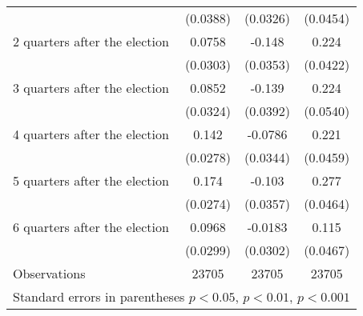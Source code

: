 \begin{table}[!ht]
\begin{tabular}{l*{3}{c}}
                    &    (0.0388)         &    (0.0326)         &    (0.0454)         \\
[0,5em]
 2 quarters after the election&      0.0758\sym{*}  &      -0.148\sym{***}&       0.224\sym{***}\\
                    &    (0.0303)         &    (0.0353)         &    (0.0422)         \\
[0,5em]
 3 quarters after the election&      0.0852\sym{**} &      -0.139\sym{***}&       0.224\sym{***}\\
                    &    (0.0324)         &    (0.0392)         &    (0.0540)         \\
[0,5em]
 4 quarters after the election&       0.142\sym{***}&     -0.0786\sym{*}  &       0.221\sym{***}\\
                    &    (0.0278)         &    (0.0344)         &    (0.0459)         \\
[0,5em]
 5 quarters after the election&       0.174\sym{***}&      -0.103\sym{**} &       0.277\sym{***}\\
                    &    (0.0274)         &    (0.0357)         &    (0.0464)         \\
[0,5em]
 6 quarters after the election&      0.0968\sym{**} &     -0.0183         &       0.115\sym{*}  \\
                    &    (0.0299)         &    (0.0302)         &    (0.0467)         \\
\hline
Observations        &       23705         &       23705         &       23705         \\
\hline\hline
\multicolumn{4}{l}{\scriptsize Standard errors in parentheses  \sym{*} \(p<0.05\), \sym{**} \(p<0.01\), \sym{***} \(p<0.001\)}\\
\end{tabular}
\end{table}
